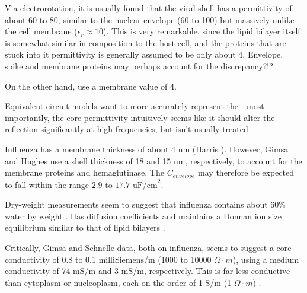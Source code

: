 \documentclass[fleqn,10pt]{paper}
\begin{document}
Via electrorotation, it is usually found that the viral shell has a permittivity of about 60 to 80, similar to the nuclear envelope (60 to 100) but massively unlike the cell membrane ($\epsilon_r\approx 10$). This is very remarkable, since the lipid bilayer itself is somewhat similar in composition to the host cell, and the proteins that are stuck into it permittivity is generally assumed to be only about 4. Envelope, spike and membrane proteins may perhaps account for the discrepancy?!?

On the other hand, \cite{Electrostatic2020a} use a membrane value of 4.

Equivalent circuit models want to more accurately represent the - most importantly, the core permittivity intuitively seems like it should alter the reflection significantly at high frequencies, but isn't usually treated 

Influenza has a membrane thickness of about 4 nm (Harris \cite{Influenza2006}). However, Gimsa and Hughes use a shell thickness of 18 and 15 nm, respectively, to account for the membrane proteins and hemaglutinase. The $C_{envelope}$ may therefore be expected to fall within the range $2.9 \text{ to } 17.7 \text{ uF/cm}^2$.

Dry-weight measurements seem to suggest that influenza contains about 60\% water by weight \cite{lauffer1944biophysical}. Has diffusion coefficients and maintains a Donnan ion size equilibrium similar to that of lipid bilayers \cite{Effect2015b}. 


% 



Critically, Gimsa and Schnelle data, both on influenza, seems to suggest a core conductivity of 0.8 to 0.1 milliSiemens/m (1000 to 10000 $\Omega \cdot m$), using a medium conductivity of 74 mS/m and 3 mS/m, respectively. This is far less conductive than cytoplasm or nucleoplasm, each on the order of 1 S/m (1 $\Omega \cdot m$) \cite{Study2001}. 
\end{document}
